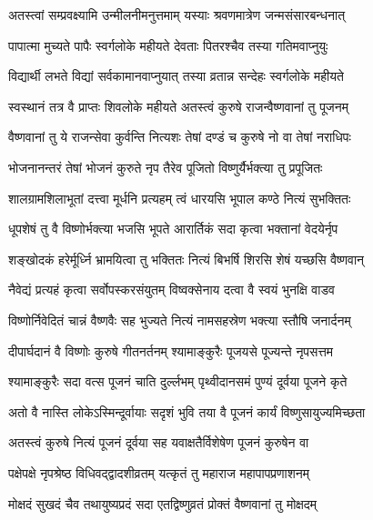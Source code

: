 \label{sec:padma-unmilani}



\twolineshloka
{अतस्त्वां सम्प्रवक्ष्यामि उन्मीलनीमनुत्तमाम्}
{यस्याः श्रवणमात्रेण जन्मसंसारबन्धनात्}%

\twolineshloka
{पापात्मा मुच्यते पापैः स्वर्गलोके महीयते}
{देवताः पितरश्चैव तस्या गतिमवाप्नुयुः}%

\twolineshloka
{विद्यार्थी लभते विद्यां सर्वकामानवाप्नुयात्}
{तस्या व्रतान्न सन्देहः स्वर्गलोके महीयते}%

\twolineshloka
{स्वस्थानं तत्र वै प्राप्तः शिवलोके महीयते}
{अतस्त्वं कुरुषे राजन्वैष्णवानां तु पूजनम्}%

\twolineshloka
{वैष्णवानां तु ये राजन्सेवा कुर्वन्ति नित्यशः}
{तेषां दण्डं च कुरुषे नो वा तेषां नराधिपः}%

\twolineshloka
{भोजनानन्तरं तेषां भोजनं कुरुते नृप}
{तैरेव पूजितो विष्णुर्यैर्भक्त्या तु प्रपूजितः}%

\twolineshloka
{शालग्रामशिलाभूतां दत्त्वा मूर्धनि प्रत्यहम्}
{त्वं धारयसि भूपाल कण्ठे नित्यं सुभक्तितः}%

\twolineshloka
{धूपशेषं तु वै विष्णोर्भक्त्या भजसि भूपते}
{आरार्तिकं सदा कृत्वा भक्तानां वेदयेर्नृप}%

\twolineshloka
{शङ्खोदकं हरेर्मूर्ध्नि भ्रामयित्वा तु भक्तितः}
{नित्यं बिभर्षि शिरसि शेषं यच्छसि वैष्णवान्}%

\twolineshloka
{नैवेद्यं प्रत्यहं कृत्वा सर्वोपस्करसंयुतम्}
{विष्वक्सेनाय दत्वा वै स्वयं भुनक्षि वाडव}%

\twolineshloka
{विष्णोर्निवेदितं चान्नं वैष्णवैः सह भुज्यते}
{नित्यं नामसहस्रेण भक्त्या स्तौषि जनार्दनम्}%

\twolineshloka
{दीपार्घदानं वै विष्णोः कुरुषे गीतनर्तनम्}
{श्यामाङ्कुरैः पूजयसे पूज्यन्ते नृपसत्तम}%

\twolineshloka
{श्यामाङ्कुरैः सदा वत्स पूजनं चाति दुर्ल्लभम्}
{पृथ्वीदानसमं पुण्यं दूर्वया पूजने कृते}%

\twolineshloka
{अतो वै नास्ति लोकेऽस्मिन्दूर्वायाः सदृशं भुवि}
{तया वै पूजनं कार्यं विष्णुसायुज्यमिच्छता}%

\twolineshloka
{अतस्त्वं कुरुषे नित्यं पूजनं दूर्वया सह}
{यवाक्षतैर्विशेषेण पूजनं कुरुषेन वा}%

\twolineshloka
{पक्षेपक्षे नृपश्रेष्ठ विधिवद्द्वादशीव्रतम्}
{यत्कृतं तु महाराज महापापप्रणाशनम्}%

\twolineshloka
{मोक्षदं सुखदं चैव तथायुष्यप्रदं सदा}
{एतद्विष्णुव्रतं प्रोक्तं वैष्णवानां तु मोक्षदम्}%

